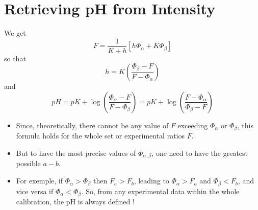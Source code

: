 \documentclass[aps]{revtex4}
\begin{document}
\section{Retrieving pH from Intensity}
We get
\begin{equation}
	F = \dfrac{1}{K+h} \left[ h \Phi_\alpha + K \Phi_\beta \right]
\end{equation}
so that
\begin{equation}
	h = K \left( \dfrac{\Phi_\beta-F}{F-\Phi_\alpha} \right)
\end{equation}
and
\begin{equation}
	pH = pK + \log \left( \dfrac{\Phi_\alpha-F}{F-\Phi_\beta}\right) = pK + \log \left( \dfrac{F-\Phi_\alpha}{\Phi_\beta-F}\right)
\end{equation}
\begin{itemize}
\item Since, theoretically, there cannot be any value of $F$ exceeding $\Phi_\alpha$ or $\Phi_\beta$, this formula holds for the whole set or experimental ratios $F$.
\item But to have the most precise values of $\Phi_{\alpha,\beta}$, one need to have the greatest possible $a-b$. 
\item For exemple, if $\Phi_\alpha>\Phi_\beta$ then $F_a>F_b$, leading to $\Phi_\alpha>F_a$ and $\Phi_\beta<F_b$, and vice versa if $\Phi_\alpha<\Phi_\beta$. 
So, from any experimental data within the whole calibration, the pH is always defined !
\end{itemize}
\end{document}

